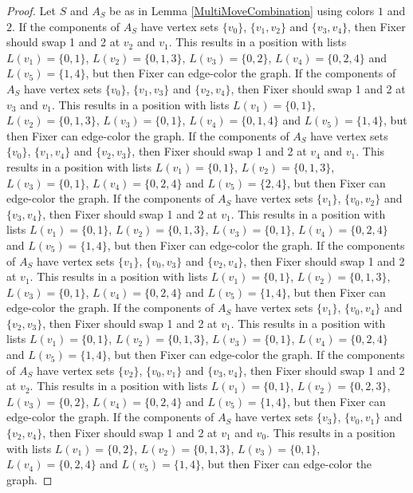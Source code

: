 \documentclass[12pt]{amsart}
\theoremstyle{plain}
\theoremstyle{definition}
\theoremstyle{remark}
\begin{document}
\begin{proof}
Let $S$ and $A_S$ be as in Lemma \ref{MultiMoveCombination} using colors $1$ and $2$. If the components of $A_S$ have vertex sets $\{v_0\}$, $\{v_1, v_2\}$ and $\{v_3, v_4\}$, then Fixer should swap 1 and 2 at $v_2$ and $v_1$. This results in a position with lists $L(v_1) = \{0, 1\}$, $L(v_2) = \{0, 1, 3\}$, $L(v_3) = \{0, 2\}$, $L(v_4) = \{0, 2, 4\}$ and $L(v_5) = \{1, 4\}$, but then Fixer can edge-color the graph.
If the components of $A_S$ have vertex sets $\{v_0\}$, $\{v_1, v_3\}$ and $\{v_2, v_4\}$, then Fixer should swap 1 and 2 at $v_3$ and $v_1$. This results in a position with lists $L(v_1) = \{0, 1\}$, $L(v_2) = \{0, 1, 3\}$, $L(v_3) = \{0, 1\}$, $L(v_4) = \{0, 1, 4\}$ and $L(v_5) = \{1, 4\}$, but then Fixer can edge-color the graph.
If the components of $A_S$ have vertex sets $\{v_0\}$, $\{v_1, v_4\}$ and $\{v_2, v_3\}$, then Fixer should swap 1 and 2 at $v_4$ and $v_1$. This results in a position with lists $L(v_1) = \{0, 1\}$, $L(v_2) = \{0, 1, 3\}$, $L(v_3) = \{0, 1\}$, $L(v_4) = \{0, 2, 4\}$ and $L(v_5) = \{2, 4\}$, but then Fixer can edge-color the graph.
If the components of $A_S$ have vertex sets $\{v_1\}$, $\{v_0, v_2\}$ and $\{v_3, v_4\}$, then Fixer should swap 1 and 2 at $v_1$. This results in a position with lists $L(v_1) = \{0, 1\}$, $L(v_2) = \{0, 1, 3\}$, $L(v_3) = \{0, 1\}$, $L(v_4) = \{0, 2, 4\}$ and $L(v_5) = \{1, 4\}$, but then Fixer can edge-color the graph.
If the components of $A_S$ have vertex sets $\{v_1\}$, $\{v_0, v_3\}$ and $\{v_2, v_4\}$, then Fixer should swap 1 and 2 at $v_1$. This results in a position with lists $L(v_1) = \{0, 1\}$, $L(v_2) = \{0, 1, 3\}$, $L(v_3) = \{0, 1\}$, $L(v_4) = \{0, 2, 4\}$ and $L(v_5) = \{1, 4\}$, but then Fixer can edge-color the graph.
If the components of $A_S$ have vertex sets $\{v_1\}$, $\{v_0, v_4\}$ and $\{v_2, v_3\}$, then Fixer should swap 1 and 2 at $v_1$. This results in a position with lists $L(v_1) = \{0, 1\}$, $L(v_2) = \{0, 1, 3\}$, $L(v_3) = \{0, 1\}$, $L(v_4) = \{0, 2, 4\}$ and $L(v_5) = \{1, 4\}$, but then Fixer can edge-color the graph.
If the components of $A_S$ have vertex sets $\{v_2\}$, $\{v_0, v_1\}$ and $\{v_3, v_4\}$, then Fixer should swap 1 and 2 at $v_2$. This results in a position with lists $L(v_1) = \{0, 1\}$, $L(v_2) = \{0, 2, 3\}$, $L(v_3) = \{0, 2\}$, $L(v_4) = \{0, 2, 4\}$ and $L(v_5) = \{1, 4\}$, but then Fixer can edge-color the graph.
If the components of $A_S$ have vertex sets $\{v_3\}$, $\{v_0, v_1\}$ and $\{v_2, v_4\}$, then Fixer should swap 1 and 2 at $v_1$ and $v_0$. This results in a position with lists $L(v_1) = \{0, 2\}$, $L(v_2) = \{0, 1, 3\}$, $L(v_3) = \{0, 1\}$, $L(v_4) = \{0, 2, 4\}$ and $L(v_5) = \{1, 4\}$, but then Fixer can edge-color the graph.

\end{proof}
\end{document}
